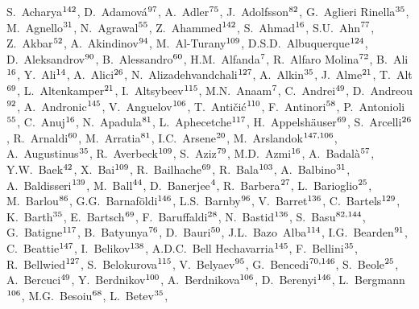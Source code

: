 % 
\begingroup
\small
\begin{flushleft} 


S.~Acharya$^{\rm 142}$, 
D.~Adamov\'{a}$^{\rm 97}$, 
A.~Adler$^{\rm 75}$, 
J.~Adolfsson$^{\rm 82}$, 
G.~Aglieri Rinella$^{\rm 35}$, 
M.~Agnello$^{\rm 31}$, 
N.~Agrawal$^{\rm 55}$, 
Z.~Ahammed$^{\rm 142}$, 
S.~Ahmad$^{\rm 16}$, 
S.U.~Ahn$^{\rm 77}$, 
Z.~Akbar$^{\rm 52}$, 
A.~Akindinov$^{\rm 94}$, 
M.~Al-Turany$^{\rm 109}$, 
D.S.D.~Albuquerque$^{\rm 124}$, 
D.~Aleksandrov$^{\rm 90}$, 
B.~Alessandro$^{\rm 60}$, 
H.M.~Alfanda$^{\rm 7}$, 
R.~Alfaro Molina$^{\rm 72}$, 
B.~Ali$^{\rm 16}$, 
Y.~Ali$^{\rm 14}$, 
A.~Alici$^{\rm 26}$, 
N.~Alizadehvandchali$^{\rm 127}$, 
A.~Alkin$^{\rm 35}$, 
J.~Alme$^{\rm 21}$, 
T.~Alt$^{\rm 69}$, 
L.~Altenkamper$^{\rm 21}$, 
I.~Altsybeev$^{\rm 115}$, 
M.N.~Anaam$^{\rm 7}$, 
C.~Andrei$^{\rm 49}$, 
D.~Andreou$^{\rm 92}$, 
A.~Andronic$^{\rm 145}$, 
V.~Anguelov$^{\rm 106}$, 
T.~Anti\v{c}i\'{c}$^{\rm 110}$, 
F.~Antinori$^{\rm 58}$, 
P.~Antonioli$^{\rm 55}$, 
C.~Anuj$^{\rm 16}$, 
N.~Apadula$^{\rm 81}$, 
L.~Aphecetche$^{\rm 117}$, 
H.~Appelsh\"{a}user$^{\rm 69}$, 
S.~Arcelli$^{\rm 26}$, 
R.~Arnaldi$^{\rm 60}$, 
M.~Arratia$^{\rm 81}$, 
I.C.~Arsene$^{\rm 20}$, 
M.~Arslandok$^{\rm 147,106}$, 
A.~Augustinus$^{\rm 35}$, 
R.~Averbeck$^{\rm 109}$, 
S.~Aziz$^{\rm 79}$, 
M.D.~Azmi$^{\rm 16}$, 
A.~Badal\`{a}$^{\rm 57}$, 
Y.W.~Baek$^{\rm 42}$, 
X.~Bai$^{\rm 109}$, 
R.~Bailhache$^{\rm 69}$, 
R.~Bala$^{\rm 103}$, 
A.~Balbino$^{\rm 31}$, 
A.~Baldisseri$^{\rm 139}$, 
M.~Ball$^{\rm 44}$, 
D.~Banerjee$^{\rm 4}$, 
R.~Barbera$^{\rm 27}$, 
L.~Barioglio$^{\rm 25}$, 
M.~Barlou$^{\rm 86}$, 
G.G.~Barnaf\"{o}ldi$^{\rm 146}$, 
L.S.~Barnby$^{\rm 96}$, 
V.~Barret$^{\rm 136}$, 
C.~Bartels$^{\rm 129}$, 
K.~Barth$^{\rm 35}$, 
E.~Bartsch$^{\rm 69}$, 
F.~Baruffaldi$^{\rm 28}$, 
N.~Bastid$^{\rm 136}$, 
S.~Basu$^{\rm 82,144}$, 
G.~Batigne$^{\rm 117}$, 
B.~Batyunya$^{\rm 76}$, 
D.~Bauri$^{\rm 50}$, 
J.L.~Bazo~Alba$^{\rm 114}$, 
I.G.~Bearden$^{\rm 91}$, 
C.~Beattie$^{\rm 147}$, 
I.~Belikov$^{\rm 138}$, 
A.D.C.~Bell Hechavarria$^{\rm 145}$, 
F.~Bellini$^{\rm 35}$, 
R.~Bellwied$^{\rm 127}$, 
S.~Belokurova$^{\rm 115}$, 
V.~Belyaev$^{\rm 95}$, 
G.~Bencedi$^{\rm 70,146}$, 
S.~Beole$^{\rm 25}$, 
A.~Bercuci$^{\rm 49}$, 
Y.~Berdnikov$^{\rm 100}$, 
A.~Berdnikova$^{\rm 106}$, 
D.~Berenyi$^{\rm 146}$, 
L.~Bergmann$^{\rm 106}$, 
M.G.~Besoiu$^{\rm 68}$, 
L.~Betev$^{\rm 35}$, 

\end{flushleft}

